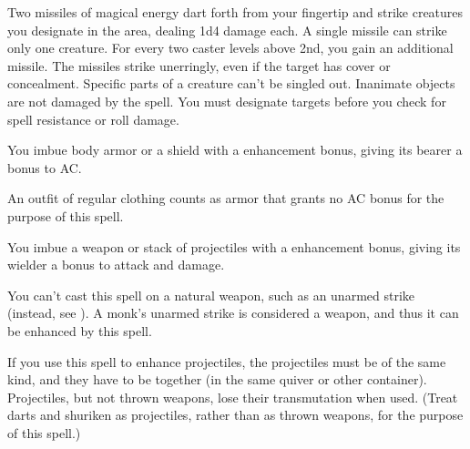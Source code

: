 \spellrng{\rngclose}
\begin{spelleffect}
  Two missiles of magical energy dart forth from your fingertip and strike creatures you designate in the area, dealing 1d4 damage each. A single missile can strike only one creature. For every two caster levels above 2nd, you gain an additional missile.
  The missiles strike unerringly, even if the target has cover or concealment. Specific parts of a creature can't be singled out. Inanimate objects are not damaged by the spell. You must designate targets before you check for spell resistance or roll damage.
\end{spelleffect}

\spellrng{\rngclose}
\spelldur{\durmed}
\begin{spelleffect}
  You imbue body armor or a shield with a  enhancement bonus, giving its bearer a  bonus to AC. \bonusscalingdescription
\end{spelleffect}
\begin{spellnotes}
  An outfit of regular clothing counts as armor that grants no AC bonus for the purpose of this spell.
\end{spellnotes}

\spellrng{\rngclose}
\spelldur{\durshort}
\begin{spelleffect}
  You imbue a weapon or stack of projectiles with a  enhancement bonus, giving its wielder a  bonus to attack and damage. \bonusscalingdescription
\end{spelleffect}
\begin{spellnotes}
  You can't cast this spell on a natural weapon, such as an unarmed strike (instead, see ). A monk's unarmed strike is considered a weapon, and thus it can be enhanced by this spell.
  \par If you use this spell to enhance projectiles, the projectiles must be of the same kind, and they have to be together (in the same quiver or other container). Projectiles, but not thrown weapons, lose their transmutation when used. (Treat darts and shuriken as projectiles, rather than as thrown weapons, for the purpose of this spell.)
\end{spellnotes}

